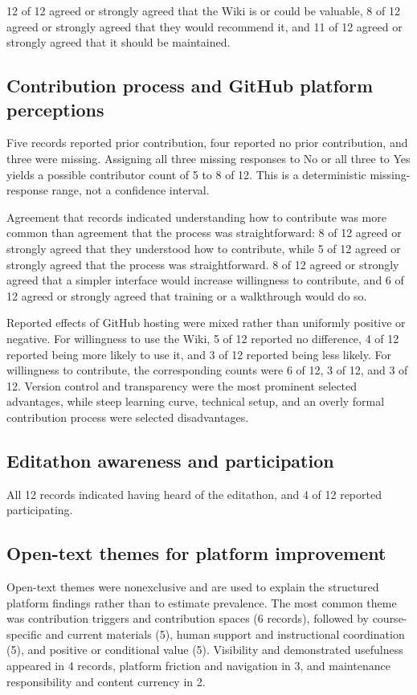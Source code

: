 \documentclass[11pt]{article}
\begin{document}
12 of 12 agreed or strongly agreed that the Wiki is or could be valuable, 8 of 12 agreed or strongly agreed that they would recommend it, and 11 of 12 agreed or strongly agreed that it should be maintained.

\subsection{Contribution process and GitHub platform perceptions}
Five records reported prior contribution, four reported no prior contribution, and three were missing. Assigning all three missing responses to No or all three to Yes yields a possible contributor count of 5 to 8 of 12. This is a deterministic missing-response range, not a confidence interval.

Agreement that records indicated understanding how to contribute was more common than agreement that the process was straightforward: 8 of 12 agreed or strongly agreed that they understood how to contribute, while 5 of 12 agreed or strongly agreed that the process was straightforward. 8 of 12 agreed or strongly agreed that a simpler interface would increase willingness to contribute, and 6 of 12 agreed or strongly agreed that training or a walkthrough would do so.

Reported effects of GitHub hosting were mixed rather than uniformly positive or negative. For willingness to use the Wiki, 5 of 12 reported no difference, 4 of 12 reported being more likely to use it, and 3 of 12 reported being less likely. For willingness to contribute, the corresponding counts were 6 of 12, 3 of 12, and 3 of 12. Version control and transparency were the most prominent selected advantages, while steep learning curve, technical setup, and an overly formal contribution process were selected disadvantages.

\subsection{Editathon awareness and participation}
All 12 records indicated having heard of the editathon, and 4 of 12 reported participating.

\subsection{Open-text themes for platform improvement}
Open-text themes were nonexclusive and are used to explain the structured platform findings rather than to estimate prevalence. The most common theme was contribution triggers and contribution spaces (6 records), followed by course-specific and current materials (5), human support and instructional coordination (5), and positive or conditional value (5). Visibility and demonstrated usefulness appeared in 4 records, platform friction and navigation in 3, and maintenance responsibility and content currency in 2.
\end{document}
